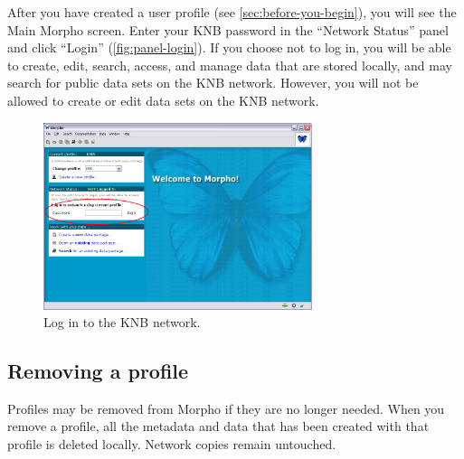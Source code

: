 After you have created a user profile (see
\autoref{sec:before-you-begin}), you will see the Main Morpho screen.
Enter your KNB password in the ``Network Status'' panel and click
``Login'' (\autoref{fig:panel-login}). If you choose not to log in, you
will be able to create, edit, search, access, and manage data that are
stored locally, and may search for public data sets on the KNB network.
However, you will not be allowed to create or edit data sets on the KNB
network.

\begin{figure}
  \centering
    \includegraphics[width=0.7\textwidth]{images/panel-login.jpg}
  \caption{Log in to the KNB network.}
  \label{fig:panel-login}
\end{figure}

\subsection{Removing a profile} \label{sec:removing-a-profile}

Profiles may be removed from Morpho if they are no longer needed.
When you remove a profile, all the metadata and data that has been created 
with that profile is deleted locally. Network copies remain untouched.

